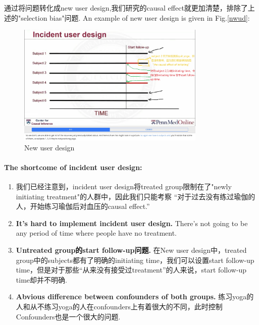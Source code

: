 通过将问题转化成new user design,我们研究的causal effect就更加清楚，排除了上述的"selection bias"问题.
An example of new user design is given in Fig.\ref{nwud}:
\begin{figure}[htbp]
	\setlength{\abovecaptionskip}{0pt}     %
	\vspace{-0cm}  %
	\setlength{\abovecaptionskip}{-0cm}   %
	\setlength{\belowcaptionskip}{0pt}   %
	\centering
	\includegraphics[width=0.8\textwidth]{figure/newud.jpg} 
	\caption{New user design}
	\label{newud}
\end{figure} 

\paragraph{The shortcome of incident user design:} 
\begin{enumerate}[label=\arabic*.]
	\item 我们已经注意到，incident user design将treated group限制在了{\color{red}"newly initiating treatment"的人群中，}因此我们只能考察{\color{red} “对于过去没有练过瑜伽的人，开始练习瑜伽后对血压的causal effect.”}
	\item {\bfseries It's hard to implement incident user design.} There's not going to be any period of time where people have no treatment.
    \item {\bfseries Untreated group的start follow-up问题.} 在New user design中，treated group中的subjects都有了明确的initiating time，我们可以设置start follow-up time，但是对于那些“从来没有接受过treatment”的人来说，start follow-up time却并不明确.
    \item {\bfseries Abvious difference between confounders of both groups.} 练习yoga的人和从不练习yoga的人在confounders上有着很大的不同，此时控制Confounders也是一个很大的问题.
\end{enumerate}

